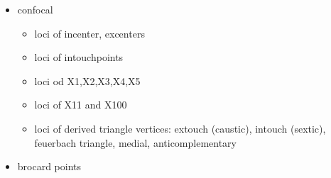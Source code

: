 \begin{itemize}
    \item confocal
    \begin{itemize}
        \item loci of incenter, excenters
        \item loci of intouchpoints
        \item loci od X1,X2,X3,X4,X5
        \item loci of X11 and X100
        \item loci of derived triangle vertices: extouch (caustic), intouch (sextic), feuerbach triangle, medial, anticomplementary 
    \end{itemize}
    \item brocard points
\end{itemize}